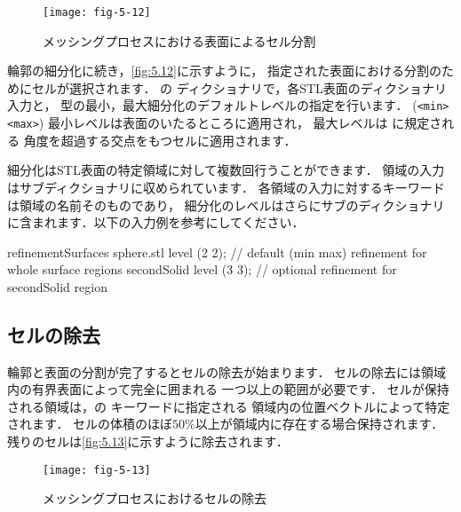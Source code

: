 \begin{figure}[ht]
 \texttt{[image: fig-5-12]}
 \caption{メッシングプロセスにおける表面によるセル分割}
 \label{fig:5.12}
\end{figure}


輪郭の細分化に続き，\autoref{fig:5.12}に示すように，
指定された表面における分割のためにセルが選択されます．
の
ディクショナリで，各STL表面のディクショナリ入力と，
型の最小，最大細分化のデフォルトレベルの指定を行います．
(\verb|<min> <max>|) 最小レベルは表面のいたるところに適用され，
最大レベルは
%
%
に規定される
角度を超過する交点をもつセルに適用されます．

細分化はSTL表面の特定領域に対して複数回行うことができます．
領域の入力はサブディクショナリに収められています．
各領域の入力に対するキーワードは領域の名前そのものであり，
細分化のレベルはさらにサブのディクショナリに含まれます．以下の入力例を参考にしてください．
\begin{OFverbatim}[file]
refinementSurfaces
  {
      sphere.stl
      {
          level (2 2); // default (min max) refinement for whole surface
          regions
          {
              secondSolid
              {
                  level (3 3); // optional refinement for secondSolid region
              }
          }
      }
  }
\end{OFverbatim}


\subsection{セルの除去}
\label{ssec:5.4.4}
%
輪郭と表面の分割が完了するとセルの除去が始まります．
セルの除去には領域内の有界表面によって完全に囲まれる
一つ以上の範囲が必要です．
セルが保持される領域は，の
%
%
キーワードに指定される
領域内の位置ベクトルによって特定されます．
セルの体積のほぼ$50\unit{\%}$以上が領域内に存在する場合保持されます．
残りのセルは\autoref{fig:5.13}に示すように除去されます．


\begin{figure}[ht]
 \texttt{[image: fig-5-13]}
 \caption{メッシングプロセスにおけるセルの除去}
 \label{fig:5.13}
\end{figure}


